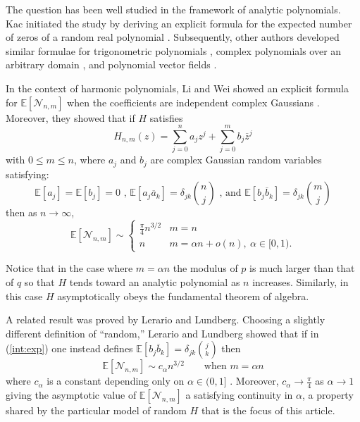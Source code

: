 \documentclass[12pt]{amsart}
\theoremstyle{remark}
\begin{document}
The question has been well studied in the framework of analytic polynomials.  Kac initiated the study by deriving an explicit formula for the expected number of zeros of a random real polynomial \cite{Kac}.  Subsequently, other authors developed similar formulae for trigonometric polynomials \cite{Dunnage}, complex polynomials over an arbitrary domain \cite{Vanderbei}, and polynomial vector fields \cite{Azais}.

In the context of harmonic polynomials, Li and Wei showed an explicit formula for $\mathbb{E}[\mathcal{N}_{n,m}]$ when the coefficients are independent complex Gaussians \cite{LiWei}.  Moreover, they showed that if $H$ satisfies
\begin{equation}
	\label{int:harmonic}
	H_{n,m}(z)=\sum_{j=0}^na_jz^j+\sum_{j=0}^mb_j\overline{z}^j
\end{equation}	
with $0\le m\le n$, where $a_j$ and $b_j$ are complex Gaussian random variables satisfying:
\begin{equation}\label{int:exp}
	\mathbb{E}[a_j]=\mathbb{E}[b_j]=0\text{ , }
	\mathbb{E}[a_j\overline{a}_k]=\delta_{jk}\binom{n}{j}\text{ , and }
	\mathbb{E}[b_j\overline{b}_k]=\delta_{jk}\binom{m}{j}
\end{equation}
then as $n\rightarrow\infty$,
\begin{equation*}
	\mathbb{E}[\mathcal{N}_{n,m}]\sim\left\{
	\begin{array}{ll}
		\frac{\pi}{4}n^{3/2}&m=n
		\\n&m=\alpha n+o(n),\ \alpha\in[0,1).
	\end{array}\right.
\end{equation*}

Notice that in the case where $m=\alpha n$ the modulus of $p$ is much larger than that of $q$ so that $H$ tends toward an analytic polynomial as $n$ increases.  Similarly, in this case $H$ asymptotically obeys the fundamental theorem of algebra.

A related result was proved by Lerario and Lundberg.  Choosing a slightly different definition of ``random,'' Lerario and Lundberg showed that if in (\ref{int:exp}) one instead defines $\mathbb{E}[b_j\overline{b}_k]=\delta_{jk}\binom{j}{k}$ then
\[\mathbb{E}[\mathcal{N}_{n,m}]\sim c_\alpha n^{3/2}\qquad\text{when $m=\alpha n$}\]
where $c_\alpha$ is a constant depending only on $\alpha\in(0,1]$ \cite{Lundberg}.  Moreover, $c_\alpha\rightarrow\frac{\pi}{4}$ as $\alpha\rightarrow1$ giving the asymptotic value of $\mathbb{E}[\mathcal{N}_{n,m}]$ a satisfying continuity in $\alpha$, a property shared by the particular model of random $H$ that is the focus of this article.
\end{document}
